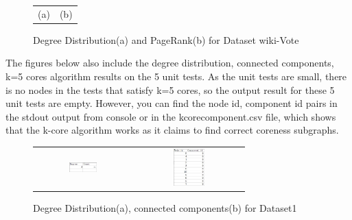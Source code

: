 \begin{figure}[H]
\begin{center}
\begin{tabular}{cc}
    (a) & (b)
\end{tabular}
\caption{Degree Distribution(a) and PageRank(b) for Dataset wiki-Vote}

\end{center}
\end{figure}

The figures below also include the degree distribution, connected components, k=5 cores algorithm results on the 5 unit tests.
As the unit tests are small, there is no nodes in the tests that satisfy k=5 cores, so the output result for these 5 
unit tests are empty. 
However, you can find the node id, component id pairs in the stdout output from console or in the kcorecomponent.csv file, which shows that the k-core
algorithm works as it claims to find correct coreness subgraphs.

\begin{figure}[H]
\begin{center}
\begin{tabular}{cc}
     \includegraphics[width=0.3\textwidth]{FIG/1dd.jpg} &
     \includegraphics[width=0.3\textwidth]{FIG/1cc.jpg} \\
\end{tabular}
\caption{Degree Distribution(a), connected components(b) for Dataset1}
\end{center}
\end{figure}

